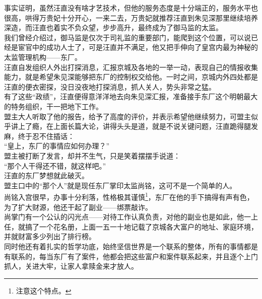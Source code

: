 \begin{multicols}{\theparacolNo}
事实证明，虽然汪直没有啥才艺技术，但他的服务态度是十分端正的，服务水平也很高，哄得万贵妃十分开心，一来二去，万贵妃就推荐汪直到朱见深那里继续培养深造，而汪直也着实不负众望，步步高升，最终成为了御马监的太监。\\

我们曾经介绍过，御马监是仅次于司礼监的重要部门，能爬到这个位置，可以说已经是宦官中的成功人士了，可是汪直并不满足，他又把手伸向了皇宫内最为神秘的太监管理机构——东厂。\\

汪直自发组织人外出打探消息，汇报京城及各地的一举一动，表现自己的情报收集能力，就是希望朱见深能够把东厂的控制权交给他。一时之间，京城内外四处都是汪直的便衣密探，没日没夜地打探消息，抓人关人，势头非常之猛。\\

有了这些“政绩”，汪直便得意洋洋地去向朱见深汇报，准备接手东厂这个明朝最大的特务组织，干一把地下工作。\\

盟主大人听取了他的报告，给予了高度的评价，并表示希望他继续努力，可盟主似乎讲上了瘾，在上面长篇大论，讲得头头是道，就是不说关键问题，汪直跪得腿发麻，终于忍不住插话：\\

“皇上，东厂的事情应如何办理？”\\

盟主被打断了发言，却并不生气，只是笑着摆摆手说道：\\

“那个人干得还不错，就这样吧。”\\

汪直的东厂梦想就此破灭。\\

盟主口中的“那个人”就是现任东厂掌印太监尚铭，这可不是一个简单的人。\\

尚铭入宫很早，办事十分利落，性格极其谨慎\footnote{注意这个特点。}，东厂在他的手下搞得有声有色，为了扩大财源，他还干起了副业——绑票敲诈。\\

尚掌门有一个公认的闪光点——对待工作认真负责，对他的副业也是如此，他一上任，就搞了一个花名册，上面一五一十地记载了京城各大富户的地址、家庭环境，并就财富多少列出了排行榜。\\

同时他还有着扎实的哲学功底，始终坚信世界是一个联系的整体，所有的事情都是有联系的，每当东厂有了案件，他都会把这些富户和案件联系起来，并且逐个上门抓人，关进大牢，让家人拿赎金来才放人。\\


\end{multicols}
